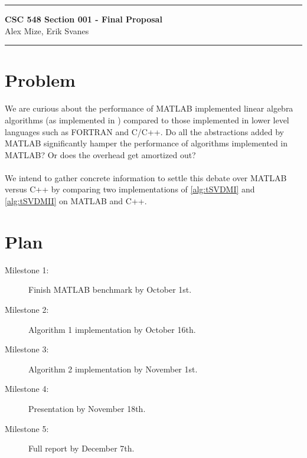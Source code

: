 \documentclass[11pt,letterpaper, onecolumn]{exam} %
\newcommand{\tbf}{\textbf}
\begin{document}
\hrule
\begin{center}
\Large 
\tbf{CSC 548 Section 001 - Final Proposal}\\
Alex Mize, Erik Svanes
\end{center}
\hrule

\pointsdroppedatright   %
\printanswers %

\section*{Problem}
We are curious about the performance of MATLAB implemented linear algebra algorithms (as implemented in \cite{kilmer2021tensor}) compared to those implemented in lower level languages such as FORTRAN and C/C++. Do all the abstractions added by MATLAB significantly hamper the performance of algorithms implemented in MATLAB? Or does the overhead get amortized out?
\\\\
We intend to gather concrete information to settle this debate over MATLAB versus C++ by comparing two implementations of \ref{alg:tSVDMI} and \ref{alg:tSVDMII} on MATLAB and C++.

\section*{Plan}
\begin{description}
  \item[Milestone 1:] Finish MATLAB benchmark by October 1st.
  \item[Milestone 2:] Algorithm 1 implementation by October 16th.
  \item[Milestone 3:] Algorithm 2 implementation by November 1st.
  \item[Milestone 4:] Presentation by November 18th.
  \item[Milestone 5:] Full report by December 7th.
\end{description}
\end{document}
